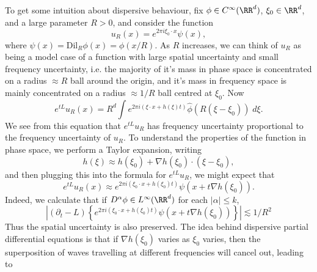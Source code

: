 To get some intuition about dispersive behaviour, fix $\phi \in C^\infty(\RR^d)$, $\xi_0 \in \RR^d$, and a large parameter $R > 0$, and consider the function
%
\[ u_R(x) = e^{2 \pi i \xi_0 \cdot x} \psi(x), \]
%
where $\psi(x) = \text{Dil}_R \phi(x) = \phi(x/R)$. As $R$ increases, we can think of $u_R$ as being a model case of a function with large spatial uncertainty and small frequency uncertainty, i.e. the majority of it's mass in phase space is concentrated on a radius $\approx R$ ball around the origin, and it's mass in frequency space is mainly concentrated on a radius $\approx 1/R$ ball centred at $\xi_0$. Now
%
\[ e^{tL} u_R(x) = R^d \int e^{2 \pi i (\xi \cdot x + h(\xi) t)} \widehat{\phi}(R(\xi - \xi_0) )\; d\xi. \]
%
We see from this equation that $e^{tL} u_R$ has frequency uncertainty proportional to the frequency uncertainty of $u_R$. To understand the properties of the function in phase space, we perform a Taylor expansion, writing
%
\[ h(\xi) \approx h(\xi_0) + \nabla h (\xi_0) \cdot (\xi - \xi_0), \]
%
and then plugging this into the formula for $e^{tL} u_R$, we might expect that
%
\[ e^{tL} u_R(x) \approx e^{2 \pi i(\xi_0 \cdot x + h(\xi_0) t)} \psi(x + t \nabla h(\xi_0)). \]
%
Indeed, we calculate that if $D^\alpha \phi \in L^\infty(\RR^d)$ for each $|\alpha| \leq k$,
%
\[ \left| (\partial_t - L) \left\{ e^{2 \pi i(\xi_0 \cdot x + h(\xi_0) t)} \psi(x + t \nabla h(\xi_0)) \right\} \right| \lesssim 1/R^2 \]
%
Thus the spatial uncertainty is also preserved. The idea behind dispersive partial differential equations is that if $\nabla h(\xi_0)$ varies as $\xi_0$ varies, then the superposition of waves travelling at different frequencies will cancel out, leading to 
%
%
%
%
%









